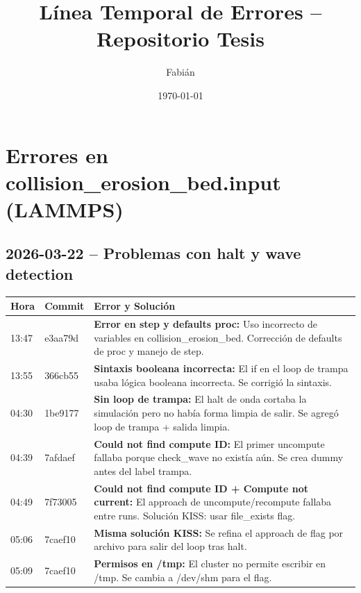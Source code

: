 \documentclass[12pt,a4paper]{article}
\title{Línea Temporal de Errores -- Repositorio Tesis}
\author{Fabián}
\date{\today}
\begin{document}
\maketitle

\section*{Errores en collision\_erosion\_bed.input (LAMMPS)}

\subsection*{2026-03-22 -- Problemas con halt y wave detection}

\begin{table}[H]
	\centering
	\begin{tabular}{@{}llp{9cm}@{}}
		\toprule
		\textbf{Hora} & \textbf{Commit} & \textbf{Error y Solución}                                                                                                                                    \\
		\midrule
		13:47         & e3aa79d         & \textbf{Error en step y defaults proc:} Uso incorrecto de variables en collision\_erosion\_bed. Corrección de defaults de proc y manejo de step.             \\
		13:55         & 366cb55         & \textbf{Sintaxis booleana incorrecta:} El if en el loop de trampa usaba lógica booleana incorrecta. Se corrigió la sintaxis.                                 \\
		04:30         & 1be9177         & \textbf{Sin loop de trampa:} El halt de onda cortaba la simulación pero no había forma limpia de salir. Se agregó loop de trampa + salida limpia.            \\
		04:39         & 7afdaef         & \textbf{Could not find compute ID:} El primer uncompute fallaba porque check\_wave no existía aún. Se crea dummy antes del label trampa.                     \\
		04:49         & 7f73005         & \textbf{Could not find compute ID + Compute not current:} El approach de uncompute/recompute fallaba entre runs. Solución KISS: usar file\_exists flag.      \\
		05:06         & 7caef10         & \textbf{Misma solución KISS:} Se refina el approach de flag por archivo para salir del loop tras halt.                                                       \\
		05:09         & 7caef10         & \textbf{Permisos en /tmp:} El cluster no permite escribir en /tmp. Se cambia a /dev/shm para el flag.                                                        \\

\end{tabular}
\end{table}
\end{document}
